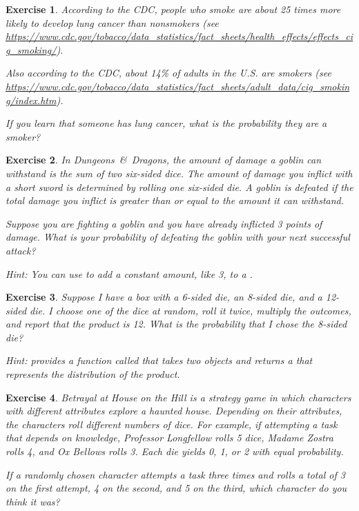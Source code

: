 \documentclass[12pt]{book}
\theoremstyle{exercise}
\newtheorem{exercise}{Exercise}[chapter]
\begin{document}
\begin{exercise}
According to the CDC, people who smoke are about 25 times more likely to develop lung cancer than nonsmokers (see \url{https://www.cdc.gov/tobacco/data_statistics/fact_sheets/health_effects/effects_cig_smoking/}).

Also according to the CDC, about 14\% of adults in the U.S. are smokers (see \url{https://www.cdc.gov/tobacco/data_statistics/fact_sheets/adult_data/cig_smoking/index.htm}). 

If you learn that someone has lung cancer, what is the probability they are a smoker?
\end{exercise}


\begin{exercise}
In {\it Dungeons~\&~Dragons}, the amount of damage a goblin can withstand is the sum of two six-sided dice. The amount of damage you inflict with a short sword is determined by rolling one six-sided die.
A goblin is defeated if the total damage you inflict is greater than or equal to the amount it can withstand.

Suppose you are fighting a goblin and you have already inflicted 3 points of damage. What is your probability of defeating the goblin with your next successful attack?

Hint: You can use  to add a constant amount, like 3, to a . 
\end{exercise}


\begin{exercise}
Suppose I have a box with a 6-sided die, an 8-sided die, and a 12-sided die.
I choose one of the dice at random, roll it twice, multiply the outcomes, and report that the product is 12.
What is the probability that I chose the 8-sided die?

Hint:  provides a function called  that takes two  objects and returns a  that represents the distribution of the product.
\end{exercise}


\begin{exercise}
{\it Betrayal at House on the Hill} is a strategy game in which characters with different attributes explore a haunted house.  Depending on their attributes, the characters roll different numbers of dice.  For example, if attempting a task that depends on knowledge, Professor Longfellow rolls 5 dice, Madame Zostra rolls 4, and Ox Bellows rolls 3.  Each die yields 0, 1, or 2 with equal probability.  

If a randomly chosen character attempts a task three times and rolls a total of 3 on the first attempt, 4 on the second, and 5 on the third, which character do you think it was?
\end{exercise}
\end{document}
